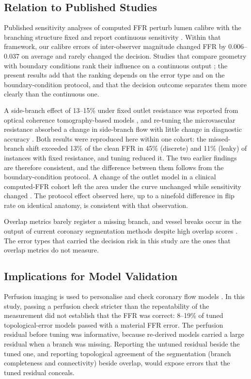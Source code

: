 \documentclass[journal]{IEEEtran}
\begin{document}
\subsection{Relation to Published Studies}
Published sensitivity analyses of computed FFR perturb lumen calibre with the branching structure fixed and report
continuous sensitivity \cite{sankaran2015tmi,sankaran2015cmame,fernandez2024,dalmaso2025}. Within that framework, our
calibre errors of inter-observer magnitude changed FFR by 0.006--0.037 on average and rarely changed the decision. Studies that compare
geometry with boundary conditions rank their influence on a continuous output \cite{sankaran2016,tanade2022,korte2023};
the present results add that the ranking depends on the error type and on the boundary-condition protocol, and that
the decision outcome separates them more clearly than the continuous one.

A side-branch effect of 13--15\% under fixed outlet resistance was reported from optical coherence tomography-based
models \cite{gamage2022}, and re-tuning the microvascular resistance absorbed a change in side-branch flow with little change in diagnostic
accuracy \cite{gosling2020}.
Both results were reproduced here within one cohort: the missed-branch shift exceeded 13\% of the clean FFR in 45\%
(discrete) and 11\% (leaky) of instances with fixed resistance, and tuning reduced it. The two earlier findings are
therefore consistent, and the difference between them follows from the boundary-condition protocol. A change of the
outlet model in a clinical computed-FFR cohort left the area under the curve unchanged while sensitivity changed
\cite{fossan2026}. The protocol effect observed here, up to a ninefold difference in flip rate on identical anatomy, is
consistent with that observation.

Overlap metrics barely register a missing branch, and vessel breaks occur in the output of current coronary
segmentation methods despite high overlap scores \cite{bransby2026}. The error types that carried the decision risk
in this study are the ones that overlap metrics do not measure.

\subsection{Implications for Model Validation}
Perfusion imaging is used to personalise and check coronary flow models \cite{menon2024}. In this study, passing a perfusion check
stricter than the repeatability of the measurement did not establish that the FFR was correct: 8--19\% of tuned
topological-error models passed with a material FFR error. The perfusion residual before tuning was informative,
because re-derived models carried a large residual when a branch was missing. Reporting the untuned residual beside
the tuned one, and reporting topological agreement of the segmentation (branch completeness and connectivity) beside
overlap, would expose errors that the tuned residual conceals.
\end{document}
